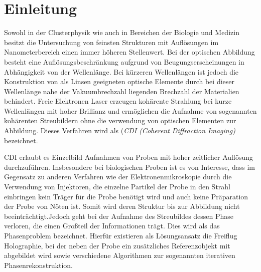 \chapter{Einleitung}
Sowohl in der Clusterphysik wie auch in Bereichen der Biologie und Medizin besitzt die Untersuchung von feinsten Strukturen mit Auflösungen im Nanometerbereich einen immer höheren Stellenwert. Bei der optischen Abbildung besteht eine Auflösungsbeschränkung aufgrund von Beugungserscheinungen in Abhängigkeit von der Wellenlänge. Bei kürzeren Wellenlängen ist jedoch die Konstruktion von als Linsen geeigneten optische Elemente durch bei dieser Wellenlänge nahe der Vakuumbrechzahl liegenden Brechzahl der Materialien behindert.
Freie Elektronen Laser erzeugen kohärente Strahlung bei kurze Wellenlängen mit hoher Brillianz und ermöglichen die Aufnahme von sogenannten kohärenten Streubildern ohne die verwendung von optischen Elementen zur Abbildung. Dieses Verfahren wird als (\textit{CDI (Coherent Diffraction Imaging)} bezeichnet.

CDI erlaubt es Einzelbild Aufnahmen von Proben mit hoher zeitlicher Auflösung durchzuführen. Insbesondere bei biologischen Proben ist es von Interesse, dass im Gegensatz zu anderen Verfahren wie der Elektronenmikroskopie durch die Verwendung von Injektoren, die einzelne Partikel der Probe in den Strahl einbringen kein Träger für die Probe benötigt wird und auch keine Präparation der Probe von Nöten ist. Somit wird deren Struktur bis zur Abbildung nicht beeinträchtigt.Jedoch geht bei der Aufnahme des Streubildes dessen Phase verloren, die einen Großteil der Informationen trägt. Dies wird als das Phasenproblem bezeichnet. Hierfür existieren als Lösungsansatz die Freiflug Holographie, bei der neben der Probe ein zusätzliches Referenzobjekt mit abgebildet wird sowie verschiedene Algorithmen zur sogenannten  iterativen Phasenrekonstruktion.

